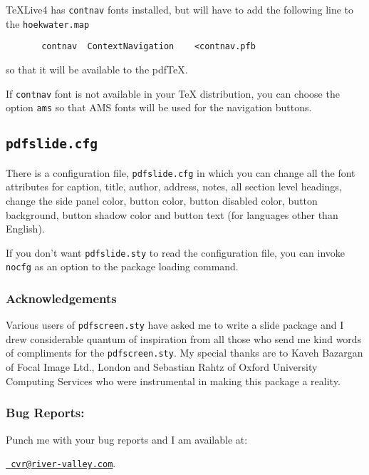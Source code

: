 \documentclass[a4paper]{article}
\begin{document}
\TeX{}Live4 has \verb+contnav+ fonts installed, but will have to add
the following line to the \verb+hoekwater.map+
\begin{verbatim}
       contnav  ContextNavigation    <contnav.pfb
\end{verbatim}
so that it will be available to the pdf\TeX.

If \verb+contnav+ font is not available in your \TeX{} distribution,
you can choose the option \verb+ams+ so that AMS fonts will be used for
the navigation buttons.

\subsection{\tt pdfslide.cfg}
There is a configuration file, \verb+pdfslide.cfg+ in which you can
change all the font attributes for caption, title, author, address, notes,
all section level headings, change the side panel color, button color,
button disabled color, button background, button shadow color and  button
text (for languages other than English).

If you don't want \verb+pdfslide.sty+ to read
the configuration file, you can invoke \verb+nocfg+ as an option to the
package loading command.

\subsubsection{Acknowledgements}
Various users of \verb+pdfscreen.sty+ have asked me to write a slide
package and I drew considerable quantum of inspiration from all those
who send me kind words of compliments for the \verb+pdfscreen.sty+.
My special thanks are to Kaveh Bazargan of Focal Image Ltd., London and
Sebastian Rahtz of Oxford University Computing Services who were
instrumental in making this package a reality. 

\subsubsection{Bug Reports:}

Punch me with your bug reports and I am available at:
\begin{center}
\href{mailto:cvr@river-valley.com}{{\color{red}\tt
cvr@river-valley.com}}.
\end{center}
\end{document}
